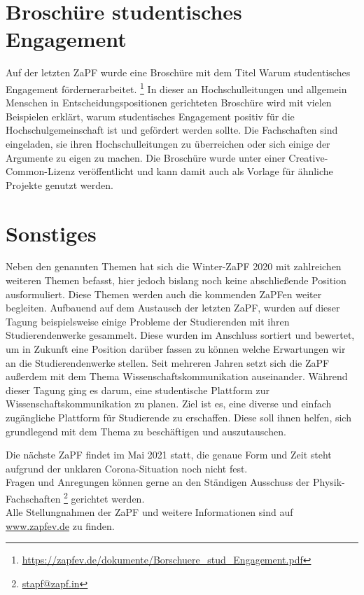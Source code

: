 \documentclass{scrartcl}
\begin{document}
\section*{Broschüre studentisches Engagement}

Auf der letzten ZaPF wurde eine Broschüre mit dem Titel \glqq Warum studentisches Engagement fördern\grqq\space erarbeitet. \footnote{\url{https://zapfev.de/dokumente/Borschuere_stud_Engagement.pdf}} In dieser an Hochschulleitungen und allgemein Menschen in Entscheidungspositionen gerichteten Broschüre wird mit vielen Beispielen erklärt, warum studentisches Engagement positiv für die Hochschulgemeinschaft ist und gefördert werden sollte. Die Fachschaften sind eingeladen, sie ihren Hochschulleitungen zu überreichen oder sich einige der Argumente zu eigen zu machen. Die Broschüre wurde unter einer Creative-Common-Lizenz veröffentlicht und kann damit auch als Vorlage für ähnliche Projekte genutzt werden.

\section*{Sonstiges}

Neben den genannten Themen hat sich die Winter-ZaPF 2020 mit zahlreichen weiteren Themen befasst, hier jedoch bislang noch keine abschließende Position ausformuliert. Diese Themen werden auch die kommenden ZaPFen weiter begleiten. Aufbauend auf dem Austausch der letzten ZaPF, wurden auf dieser Tagung beispielsweise einige Probleme der Studierenden mit ihren Studierendenwerke gesammelt. Diese wurden im Anschluss sortiert und bewertet, um in Zukunft eine Position darüber fassen zu können welche Erwartungen wir an die Studierendenwerke stellen. Seit mehreren Jahren setzt sich die ZaPF außerdem mit dem Thema Wissenschaftskommunikation auseinander. Während dieser Tagung ging es darum, eine studentische Plattform zur Wissenschaftskommunikation zu planen. Ziel ist es, eine diverse und einfach zugängliche Plattform für Studierende zu erschaffen. Diese soll ihnen helfen, sich grundlegend mit dem Thema zu beschäftigen und auszutauschen.

Die nächste ZaPF findet im Mai 2021 statt, die genaue Form und Zeit steht aufgrund der unklaren Corona-Situation noch nicht fest. \\
Fragen und Anregungen können gerne an den Ständigen Ausschuss der Physik-Fachschaften \footnote{\url{stapf@zapf.in}} gerichtet werden.\\
Alle Stellungnahmen der ZaPF und weitere Informationen sind auf \url{www.zapfev.de} zu finden.
\end{document}
